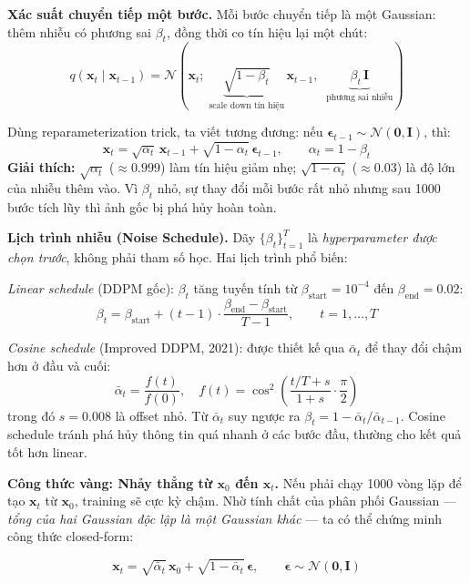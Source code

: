 \textbf{Xác suất chuyển tiếp một bước.}
Mỗi bước chuyển tiếp là một Gaussian: thêm nhiễu có phương sai $\beta_t$, đồng thời co tín hiệu lại một chút:
\begin{equation}
    q(\mathbf{x}_t \mid \mathbf{x}_{t-1}) = \mathcal{N}\!\left(\mathbf{x}_t;\; \underbrace{\sqrt{1-\beta_t}}_{\text{scale down tín hiệu}}\,\mathbf{x}_{t-1},\;\; \underbrace{\beta_t\,\mathbf{I}}_{\text{phương sai nhiễu}}\right)
    \label{eq:forward_step}
\end{equation}

Dùng reparameterization trick, ta viết tương đương: nếu $\boldsymbol{\epsilon}_{t-1} \sim \mathcal{N}(\mathbf{0},\mathbf{I})$, thì:
\[
    \mathbf{x}_t = \sqrt{\alpha_t}\,\mathbf{x}_{t-1} + \sqrt{1-\alpha_t}\,\boldsymbol{\epsilon}_{t-1}, \qquad \alpha_t = 1 - \beta_t
\]
\textbf{Giải thích:} $\sqrt{\alpha_t}$ ($\approx 0.999$) làm tín hiệu giảm nhẹ; $\sqrt{1-\alpha_t}$ ($\approx 0.03$) là độ lớn của nhiễu thêm vào. Vì $\beta_t$ nhỏ, sự thay đổi mỗi bước rất nhỏ nhưng sau 1000 bước tích lũy thì ảnh gốc bị phá hủy hoàn toàn.

\textbf{Lịch trình nhiễu (Noise Schedule).}
Dãy $\{\beta_t\}_{t=1}^T$ là \textit{hyperparameter được chọn trước}, không phải tham số học. Hai lịch trình phổ biến:

\textit{Linear schedule} (DDPM gốc): $\beta_t$ tăng tuyến tính từ $\beta_\text{start} = 10^{-4}$ đến $\beta_\text{end} = 0.02$:
\[
    \beta_t = \beta_\text{start} + (t-1) \cdot \frac{\beta_\text{end} - \beta_\text{start}}{T-1}, \qquad t = 1, \ldots, T
\]

\textit{Cosine schedule} (Improved DDPM, 2021): được thiết kế qua $\bar{\alpha}_t$ để thay đổi chậm hơn ở đầu và cuối:
\[
    \bar{\alpha}_t = \frac{f(t)}{f(0)}, \quad f(t) = \cos^2\!\left(\frac{t/T + s}{1+s} \cdot \frac{\pi}{2}\right)
\]
trong đó $s = 0.008$ là offset nhỏ. Từ $\bar{\alpha}_t$ suy ngược ra $\beta_t = 1 - \bar{\alpha}_t/\bar{\alpha}_{t-1}$. Cosine schedule tránh phá hủy thông tin quá nhanh ở các bước đầu, thường cho kết quả tốt hơn linear.

\textbf{Công thức vàng: Nhảy thẳng từ $\mathbf{x}_0$ đến $\mathbf{x}_t$.}
Nếu phải chạy 1000 vòng lặp để tạo $\mathbf{x}_t$ từ $\mathbf{x}_0$, training sẽ cực kỳ chậm. Nhờ tính chất của phân phối Gaussian --- \textit{tổng của hai Gaussian độc lập là một Gaussian khác} --- ta có thể chứng minh công thức closed-form:

\begin{equation}
    \boxed{\mathbf{x}_t = \sqrt{\bar{\alpha}_t}\,\mathbf{x}_0 + \sqrt{1-\bar{\alpha}_t}\,\boldsymbol{\epsilon}, \qquad \boldsymbol{\epsilon} \sim \mathcal{N}(\mathbf{0},\mathbf{I})}
    \label{eq:ddpm_forward_direct}
\end{equation}

